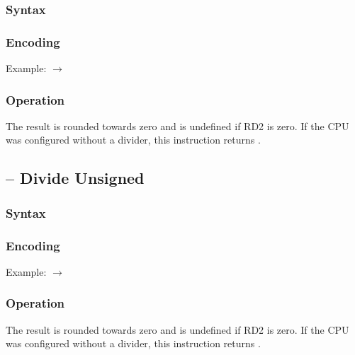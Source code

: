 \documentclass[a4paper,12pt,twoside,extrafontsizes]{memoir}
\begin{document}
{\subsubsection{Syntax}


\subsubsection{Encoding}


Example:  $\rightarrow$ 

\subsubsection{Operation}


The result is rounded towards zero and is undefined if RD2 is zero. If the CPU was configured without a divider, this instruction returns .

\subsection{ -- Divide Unsigned}
\label{subsec:instr:divu}

\subsubsection{Syntax}


\subsubsection{Encoding}


Example:  $\rightarrow$ 

\subsubsection{Operation}


The result is rounded towards zero and is undefined if RD2 is zero. If the CPU was configured without a divider, this instruction returns .

}
\end{document}
